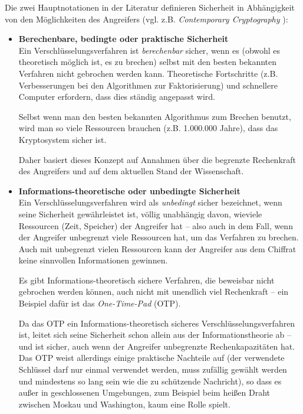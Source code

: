 \begin{refsegment}
Die zwei Hauptnotationen in der Literatur definieren Sicherheit in
Abhängigkeit von den Möglichkeiten des Angreifers (vgl. z.B.
{\em Contemporary Cryptography} \cite{Oppliger2011}):

\begin{itemize}

\item \textbf{Berechenbare, bedingte oder praktische Sicherheit}\\
  Ein Verschlüsselungsverfahren ist {\em berechenbar} sicher, wenn es (obwohl
  es theoretisch möglich ist, es zu brechen) selbst mit den besten bekannten
  Verfahren nicht gebrochen werden kann. Theoretische Fortschritte (z.B.
  Verbesserungen bei den Algorithmen zur Faktorisierung) und schnellere
  Computer erfordern, dass dies ständig angepasst wird.

  Selbst wenn man den besten bekannten Algorithmus zum Brechen benutzt, wird
  man so viele Ressourcen brauchen (z.B. 1.000.000 Jahre), dass das Kryptosystem
  sicher ist.

  Daher basiert dieses Konzept auf Annahmen über die begrenzte Rechenkraft des
  Angreifers und auf dem aktuellen Stand der Wissenschaft.

\item \textbf{Informations-theoretische oder unbedingte Sicherheit}\\
  Ein Verschlüsselungsverfahren wird als {\em unbedingt} sicher bezeichnet,
  wenn seine Sicherheit gewährleistet ist, völlig unabhängig davon, wieviele
  Ressourcen (Zeit, Speicher) der Angreifer hat -- also auch in dem Fall,
  wenn der Angreifer unbegrenzt viele Ressourcen hat, um das
  Verfahren zu brechen. Auch mit unbegrenzt vielen Ressourcen kann der
  Angreifer aus dem Chiffrat keine sinnvollen Informationen gewinnen.

  Es gibt Informations-theoretisch sichere Verfahren, die beweisbar nicht
  gebrochen werden können, auch nicht mit unendlich viel Rechenkraft -- ein
  Beispiel dafür ist das {\em One-Time-Pad} (OTP).

  Da das OTP ein Informations-theoretisch sicheres Verschlüsselungsverfahren
  ist, leitet sich seine Sicherheit schon allein aus der Informationstheorie
  ab -- und ist sicher, auch wenn der Angreifer unbegrenzte Rechenkapazitäten
  hat. Das OTP weist allerdings einige praktische Nachteile auf (der
  verwendete Schlüssel darf nur einmal verwendet werden, muss zufällig
  gewählt werden und mindestens so lang sein wie die zu schützende Nachricht),
  so dass es außer in geschlossenen Umgebungen, zum Beispiel beim heißen
  Draht zwischen Moskau und Washington, kaum eine Rolle spielt.


\end{itemize}
\end{refsegment}
